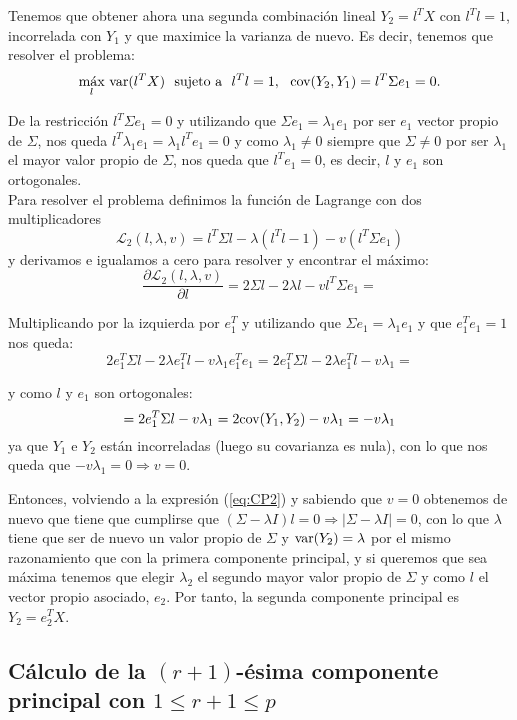 Tenemos que obtener ahora una segunda combinación lineal $Y_2 = l^TX$ con $l^Tl=1$, incorrelada con $Y_1$ y que maximice la varianza de nuevo. Es decir, tenemos que resolver el problema:
\[	\underset{l}{\text{máx}}\ \var{(l^TX)} \ \ \text{sujeto a} \ \  l^Tl = 1,\ \ \cov{(Y_2, Y_1)} = l^T \Sigma e_1 = 0.	\]

De la restricción $l^T \Sigma e_1 = 0$ y utilizando que $\Sigma e_1 = \lambda_1 e_1$ por ser $e_1$ vector propio de $\Sigma$, nos queda $l^T \lambda_1 e_1 = \lambda_1 l^T e_1 = 0$ y como $\lambda_1 \neq 0$ siempre que $\Sigma \neq 0$ por ser $\lambda_1$ el mayor valor propio de $\Sigma$, nos queda que $l^T e_1 = 0$, es decir, $l$ y $e_1$ son ortogonales.\\

Para resolver el problema definimos la función de Lagrange con dos multiplicadores
\[	\mathcal{L}_2(l, \lambda, v) = l^T \Sigma l - \lambda (l^Tl - 1) - v(l^T \Sigma e_1) 	\]
y derivamos e igualamos a cero para resolver y encontrar el máximo:
\[	\frac{\partial \mathcal{L}_2(l, \lambda, v)}{\partial l} = 2 \Sigma l - 2 \lambda l - v l^T \Sigma e_1 =	\]

Multiplicando por la izquierda por $e_1^T$ y utilizando que $\Sigma e_1 = \lambda_1 e_1$ y que $e_1^T e_1 = 1$ nos queda:
\begin{equation} \label{eq:CP2}
	2 e_1^T \Sigma l - 2 \lambda e_1^T l - v \lambda_1 e_1^T e_1 = 2 e_1^T \Sigma l - 2 \lambda e_1^T l - v \lambda_1 =
\end{equation}

y como $l$ y $e_1$ son ortogonales:
\[	= 2 e_1^T \Sigma l - v \lambda_1 = 2 \text{cov}{(Y_1, Y_2)} - v \lambda_1 = -v \lambda_1	\]
ya que $Y_1$ e $Y_2$ están incorreladas (luego su covarianza es nula), con lo que nos queda que $-v \lambda_1 = 0 \Rightarrow v = 0$.

Entonces, volviendo a la expresión (\ref{eq:CP2}) y sabiendo que $v=0$ obtenemos de nuevo que tiene que cumplirse que $(\Sigma - \lambda I) l = 0 \Rightarrow |\Sigma - \lambda I| = 0$, con lo que $\lambda$ tiene que ser de nuevo un valor propio de $\Sigma$ y $\text{var}{(Y_2)} = \lambda$ por el mismo razonamiento que con la primera componente principal, y si queremos que sea máxima tenemos que elegir $\lambda_2$ el segundo mayor valor propio de $\Sigma$ y como $l$ el vector propio asociado, $e_2$. Por tanto, la segunda componente principal es $Y_2 = e_2^TX$.

\subsection{Cálculo de la $(r+1)$-ésima componente principal con $1 \leq r+1 \leq p$ }

